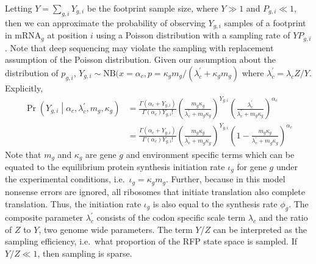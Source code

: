 \documentclass{article}
\newcommand{\alphac}{\ensuremath{{\alpha_c}}\xspace}
\newcommand{\lambdac}{\ensuremath{{\lambda_c}}\xspace}
\newcommand{\lambdacprime}{\ensuremath{{\lambda_c^\prime}}\xspace}
\newcommand{\pgi}{\ensuremath{{p_{g,i}}}\xspace}
\newcommand{\Pgi}{\ensuremath{{P_{g,i}}}\xspace}
\newcommand{\mg}{\ensuremath{{m_g}}\xspace}
\newcommand{\iotag}{\ensuremath{{\iota_g}}\xspace}
\newcommand{\phig}{\ensuremath{{\phi_g}}\xspace}
\newcommand{\kappag}{\ensuremath{{\kappa_{g}}}\xspace}
\newcommand{\Ztheta}{\ensuremath{{Z}}\xspace}
\newcommand{\mRNAg}{mRNA$_g$\xspace}
\newcommand{\Ytotal}{\ensuremath{{Y}}\xspace}
\newcommand{\Ygi}{\ensuremath{{Y_{g,i}}}\xspace}
\begin{document}
Letting $\Ytotal = \sum_{g,i}\Ygi$ be the footprint sample size, where $\Ytotal \gg 1$ and $\Pgi \ll 1$, then we can approximate the probability of observing $\Ygi$ samples of a footprint in \mRNAg at position $i$ using a Poisson distribution with a sampling rate of $\Ytotal \Pgi$.
Note that deep sequencing may violate the sampling with replacement assumption of the Poisson distribution.
Given our assumption about the distribution of $\pgi$,  $\Ygi \sim \text{NB}(x = \alphac, p = \kappag \mg /(\lambdacprime + \kappag \mg)$ where $\lambdacprime = \lambdac \Ztheta/\Ytotal$.
Explicitly,
\begin{align}
  \Pr\left(\Ygi \middle| \alphac, \lambdacprime, \mg, \kappag\right) &= \frac{\Gamma\left(\alphac + \Ygi\right)}{\Gamma\left(\alphac\right) \Ygi!} 
  \left(\frac{\mg \kappag}{\lambdacprime + \mg \kappag}\right)^\Ygi \left(\frac{\lambdacprime}{\lambdacprime + \mg \kappag}\right)^\alphac \nonumber\\
  \label{eq:distYgSite}
  &=\frac{\Gamma\left(\alphac + \Ygi\right)}{\Gamma\left(\alphac\right) \Ygi!} 
  \left(\frac{\mg \kappag}{\lambdacprime + \mg \kappag}\right)^\Ygi \left(1-\frac{\mg \kappag}{\lambdacprime + \mg \kappag}\right)^\alphac
\end{align}
Note that $\mg$ and \kappag are gene $g$ and environment specific terms which can be equated to the equilibrium protein synthesis initiation rate $\iotag$ for gene $g$ under the experimental conditions, i.e.~$\iotag = \kappag \mg$.
Further, because in this model nonsense errors are ignored, all ribosomes that initiate translation also complete translation.
Thus, the initiation rate \iotag is also equal to the synthesis rate \phig.
The composite parameter \lambdacprime consists of the codon specific scale term \lambdac and  the ratio of \Ztheta to \Ytotal, two genome wide parameters.
The term \Ytotal/\Ztheta can be interpreted as the sampling efficiency, i.e.~what proportion of the RFP state space is sampled.
If $\Ytotal/\Ztheta \ll 1$, then sampling is sparse.
\end{document}
